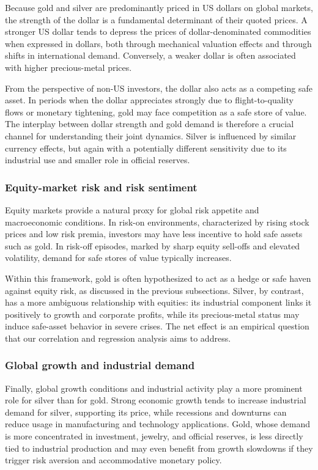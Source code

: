 Because gold and silver are predominantly priced in US dollars on global markets, the
strength of the dollar is a fundamental determinant of their quoted prices. A stronger US
dollar tends to depress the prices of dollar-denominated commodities when expressed in
dollars, both through mechanical valuation effects and through shifts in international
demand. Conversely, a weaker dollar is often associated with higher precious-metal prices.

From the perspective of non-US investors, the dollar also acts as a competing safe asset.
In periods when the dollar appreciates strongly due to flight-to-quality flows or monetary
tightening, gold may face competition as a safe store of value. The interplay between
dollar strength and gold demand is therefore a crucial channel for understanding their
joint dynamics. Silver is influenced by similar currency effects, but again with a
potentially different sensitivity due to its industrial use and smaller role in official
reserves.
\subsubsection{Equity-market risk and risk sentiment}

Equity markets provide a natural proxy for global risk appetite and macroeconomic
conditions. In risk-on environments, characterized by rising stock prices and low risk
premia, investors may have less incentive to hold safe assets such as gold. In risk-off
episodes, marked by sharp equity sell-offs and elevated volatility, demand for safe stores
of value typically increases.

Within this framework, gold is often hypothesized to act as a hedge or safe haven against
equity risk, as discussed in the previous subsections. Silver, by contrast, has a more
ambiguous relationship with equities: its industrial component links it positively to
growth and corporate profits, while its precious-metal status may induce safe-asset
behavior in severe crises. The net effect is an empirical question that our correlation
and regression analysis aims to address.
\subsubsection{Global growth and industrial demand}

Finally, global growth conditions and industrial activity play a more prominent role for
silver than for gold. Strong economic growth tends to increase industrial demand for
silver, supporting its price, while recessions and downturns can reduce usage in
manufacturing and technology applications. Gold, whose demand is more concentrated in
investment, jewelry, and official reserves, is less directly tied to industrial production
and may even benefit from growth slowdowns if they trigger risk aversion and accommodative
monetary policy.

